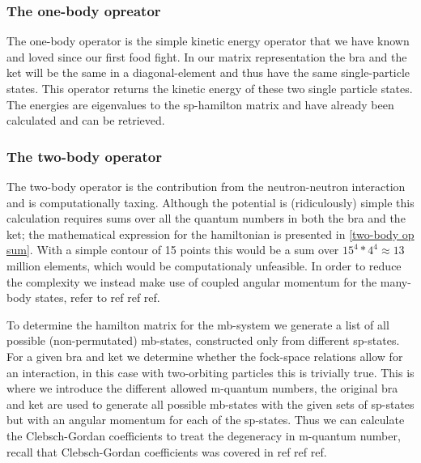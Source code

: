 \documentclass[../main/report.tex]{subfiles}
\begin{document}
\subsubsection{The one-body opreator}
The one-body operator is the simple kinetic energy operator that we have known and loved since our first food fight. 
 In our matrix representation the bra and the ket will be the same in a diagonal-element and thus have the same single-particle states.
 This operator returns the kinetic energy of these two single particle states. 
 The energies are eigenvalues to the sp-hamilton matrix and have already been calculated and can be retrieved.

\subsubsection{The two-body operator}
The two-body operator is the contribution from the neutron-neutron interaction and is computationally taxing. Although the potential is (ridiculously) simple this calculation requires sums over all the quantum numbers in both the bra and the ket; the mathematical expression for the hamiltonian is presented in \cref{two-body op sum}. 
With a simple contour of 15 points this would be a sum over $15^4*4^4 \approx 13$ million elements, which would be computationaly unfeasible.
In order to reduce the complexity we instead make use of coupled angular momentum for the many-body states, refer to ref ref ref.



To determine the hamilton matrix  for the mb-system we generate a list of all possible (non-permutated) mb-states, constructed only from different sp-states.
For a given bra and ket we determine whether the fock-space relations allow for an interaction, in this case with two-orbiting particles this is trivially true.
This is where we introduce the different allowed m-quantum numbers, the original bra and ket are used to generate all possible mb-states with the given sets of sp-states but with an angular momentum for each of the sp-states.
Thus we can calculate the Clebsch-Gordan coefficients to treat the degeneracy in m-quantum number, recall that Clebsch-Gordan coefficients was covered in ref ref ref.
\end{document}
